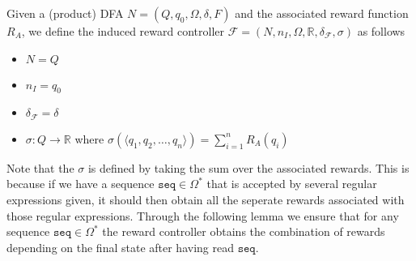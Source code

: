 \begin{definition}
Given a (product) DFA $N=(Q,q_0,\Omega,\delta,F)$ and the associated reward function $R_A$, we define the induced reward controller $\mathcal{F}=(N,n_I,\Omega, \mathbb{R}, \delta_\mathcal{F},\sigma)$ as follows
\begin{itemize}
\item $N=Q$
\item $n_I=q_0$
\item $\delta_\mathcal{F}=\delta$
\item $\sigma: Q\to\mathbb{R}$ where $\sigma(\langle q_1,q_2,\dots, q_n\rangle) = \sum\limits _{i=1}^n R_A(q_i)$
\end{itemize}
\label{d:reward_controller_regex}
\end{definition}

Note that the $\sigma$ is defined by taking the sum over the associated rewards. This is because if we have a sequence $\texttt{seq}\in\Omega^*$ that is accepted by several regular expressions given, it should then obtain all the seperate rewards associated with those regular expressions. Through the following lemma we ensure that for any sequence $\texttt{seq}\in\Omega^*$ the reward controller obtains the combination of rewards depending on the final state after having read $\texttt{seq}$.

